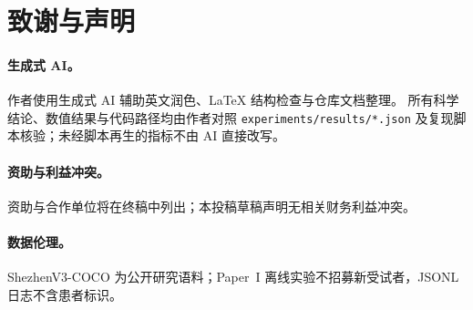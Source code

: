 \section*{致谢与声明}

\paragraph{生成式 AI。}
作者使用生成式 AI 辅助英文润色、\LaTeX{} 结构检查与仓库文档整理。
所有科学结论、数值结果与代码路径均由作者对照 \texttt{experiments/results/*.json} 及复现脚本核验；未经脚本再生的指标不由 AI 直接改写。

\paragraph{资助与利益冲突。}
资助与合作单位将在终稿中列出；本投稿草稿声明无相关财务利益冲突。

\paragraph{数据伦理。}
ShezhenV3-COCO 为公开研究语料；Paper~I 离线实验不招募新受试者，JSONL 日志不含患者标识。
